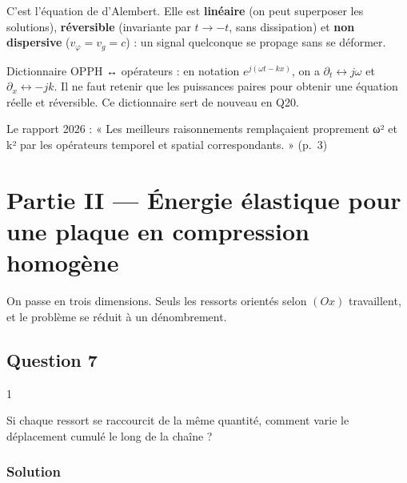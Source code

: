 \documentclass[11pt,a4paper]{article}
\newcommand{\equationajustee}[1]{%
  \sbox{\boiteequation}{$\displaystyle #1$}%
  \ifdim\wd\boiteequation>\linewidth
    \[\resizebox{\linewidth}{!}{\usebox{\boiteequation}}\]%
  \else
    \[#1\]%
  \fi}
\begin{document}
\equationajustee{\boxed{\frac{\partial^2u}{\partial t^2}=c^2\,\frac{\partial^2u}{\partial x^2}}}

C'est l'équation de d'Alembert. Elle est \textbf{linéaire} (on peut superposer les solutions), \textbf{réversible} (invariante par \(t\to-t\), sans dissipation) et \textbf{non dispersive} (\(v_\varphi=v_g=c\)) : un signal quelconque se propage sans se déformer.

\begin{methode}

Dictionnaire OPPH ↔ opérateurs : en notation \(e^{j(\omega t-kx)}\), on a \(\partial_t\leftrightarrow j\omega\) et \(\partial_x\leftrightarrow-jk\). Il ne faut retenir que les puissances paires pour obtenir une équation réelle et réversible. Ce dictionnaire sert de nouveau en Q20.

\end{methode}

\begin{jury}

Le rapport 2026 : « Les meilleurs raisonnements remplaçaient proprement ω² et k² par les opérateurs temporel et spatial correspondants. » (p.~3)

\end{jury}

\hypertarget{partie-ii-uxe9nergie-uxe9lastique-pour-une-plaque-en-compression-homoguxe8ne}{%
\section{Partie II --- Énergie élastique pour une plaque en compression homogène}\label{partie-ii-uxe9nergie-uxe9lastique-pour-une-plaque-en-compression-homoguxe8ne}}

On passe en trois dimensions. Seuls les ressorts orientés selon \((Ox)\) travaillent, et le problème se réduit à un dénombrement.

\hypertarget{question-7}{%
\subsection{Question 7}\label{question-7}}

\begin{indication}{1}

Si chaque ressort se raccourcit de la même quantité, comment varie le déplacement cumulé le long de la chaîne ?

\end{indication}

\hypertarget{solution-6}{%
\subsubsection{Solution}\label{solution-6}}
\end{document}
